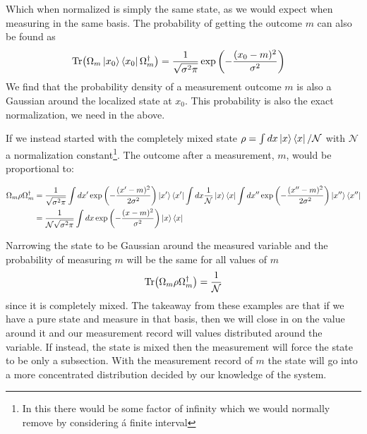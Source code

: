 Which when normalized is simply the same state, as we would expect when measuring in the same basis. The probability of getting the outcome $m$ can also be found as
\begin{align}
    \Tr(\Omega_m \ket{x_0}\bra{x_0} \Omega_m^\dagger) &= \frac{1}{\sqrt{\sigma^2\pi}} \exp\left(-\frac{(x_0 - m)^2}{\sigma^2}\right)
\end{align}
We find that the probability density of a measurement outcome $m$ is also a Gaussian around the localized state at $x_0$. This probability is also the exact normalization, we need in the above. 

If we instead started with the completely mixed state $\rho = \int dx \ket{x}\bra{x} / \mathcal{N}$ with $\mathcal{N}$ a normalization constant\footnote{In this there would be some factor of infinity which we would normally remove by considering á finite interval}. The outcome after a measurement, $m$, would be proportional to:
\begin{fullwidth}
\begin{align}
        \Omega_m \rho  \Omega_m^\dagger &= \frac{1}{\sqrt{\sigma^2\pi}}\int dx' \exp\left(-\frac{(x'- m)^2}{2\sigma^2}\right)\ket{x'}\bra{x'}\int dx \frac{1}{\mathcal{N}}\ket{x}\bra{x}\int dx'' \exp\left(-\frac{(x''- m)^2}{2\sigma^2}\right)\ket{x''}\bra{x''} \nonumber \\
        &= \frac{1}{\mathcal{N}\sqrt{\sigma^2\pi}}\int dx\exp\left(-\frac{(x- m)^2}{\sigma^2}\right)\ket{x}\bra{x}
\end{align}
\end{fullwidth}
Narrowing the state to be Gaussian around the measured variable and the probability of measuring $m$ will be the same for all values of $m$
\begin{equation}
     \Tr(\Omega_m \rho \Omega_m^\dagger) = \frac{1}{\mathcal{N}}
\end{equation}
since it is completely mixed. The takeaway from these examples are that if we have a pure state and measure in that basis, then we will close in on the value around it and our measurement record will values distributed around the variable. If instead, the state is mixed then the measurement will force the state to be only a subsection. With the measurement record of $m$ the state will go into a more concentrated distribution decided by our knowledge of the system. 


